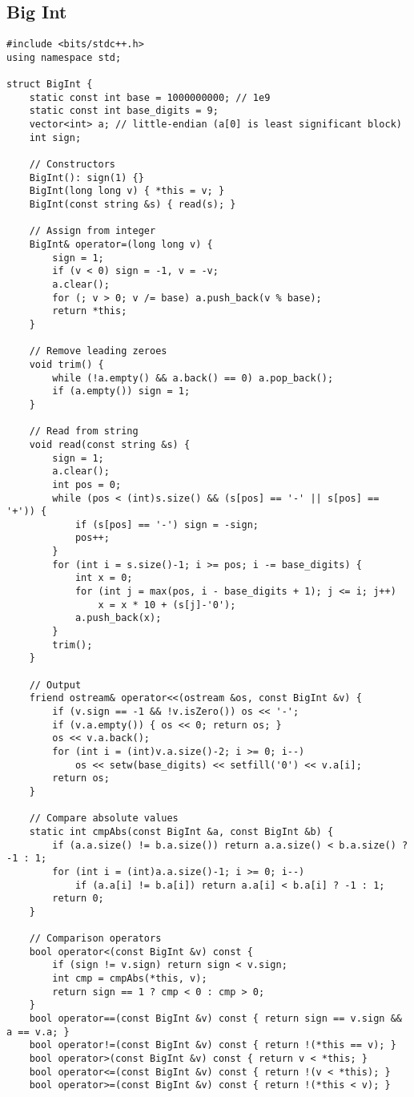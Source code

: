 \documentclass[11pt,a4paper]{article}
\begin{document}
\begin{multicols*}{2}
\begin{lstlisting}
\end{lstlisting}

\subsection{Big Int}
\begin{lstlisting}
#include <bits/stdc++.h>
using namespace std;

struct BigInt {
    static const int base = 1000000000; // 1e9
    static const int base_digits = 9;
    vector<int> a; // little-endian (a[0] is least significant block)
    int sign;

    // Constructors
    BigInt(): sign(1) {}
    BigInt(long long v) { *this = v; }
    BigInt(const string &s) { read(s); }

    // Assign from integer
    BigInt& operator=(long long v) {
        sign = 1;
        if (v < 0) sign = -1, v = -v;
        a.clear();
        for (; v > 0; v /= base) a.push_back(v % base);
        return *this;
    }

    // Remove leading zeroes
    void trim() {
        while (!a.empty() && a.back() == 0) a.pop_back();
        if (a.empty()) sign = 1;
    }

    // Read from string
    void read(const string &s) {
        sign = 1;
        a.clear();
        int pos = 0;
        while (pos < (int)s.size() && (s[pos] == '-' || s[pos] == '+')) {
            if (s[pos] == '-') sign = -sign;
            pos++;
        }
        for (int i = s.size()-1; i >= pos; i -= base_digits) {
            int x = 0;
            for (int j = max(pos, i - base_digits + 1); j <= i; j++)
                x = x * 10 + (s[j]-'0');
            a.push_back(x);
        }
        trim();
    }

    // Output
    friend ostream& operator<<(ostream &os, const BigInt &v) {
        if (v.sign == -1 && !v.isZero()) os << '-';
        if (v.a.empty()) { os << 0; return os; }
        os << v.a.back();
        for (int i = (int)v.a.size()-2; i >= 0; i--)
            os << setw(base_digits) << setfill('0') << v.a[i];
        return os;
    }

    // Compare absolute values
    static int cmpAbs(const BigInt &a, const BigInt &b) {
        if (a.a.size() != b.a.size()) return a.a.size() < b.a.size() ? -1 : 1;
        for (int i = (int)a.a.size()-1; i >= 0; i--)
            if (a.a[i] != b.a[i]) return a.a[i] < b.a[i] ? -1 : 1;
        return 0;
    }

    // Comparison operators
    bool operator<(const BigInt &v) const {
        if (sign != v.sign) return sign < v.sign;
        int cmp = cmpAbs(*this, v);
        return sign == 1 ? cmp < 0 : cmp > 0;
    }
    bool operator==(const BigInt &v) const { return sign == v.sign && a == v.a; }
    bool operator!=(const BigInt &v) const { return !(*this == v); }
    bool operator>(const BigInt &v) const { return v < *this; }
    bool operator<=(const BigInt &v) const { return !(v < *this); }
    bool operator>=(const BigInt &v) const { return !(*this < v); }


\end{lstlisting}
\end{multicols*}
\end{document}
